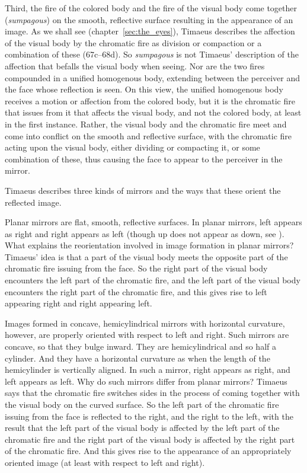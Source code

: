 Third, the fire of the colored body and the fire of the visual body come together (\emph{sumpagous}) on the smooth, reflective surface resulting in the appearance of an image. As we shall see (chapter~\ref{sec:the_eyes}), Timaeus describes the affection of the visual body by the chromatic fire as division  or compaction or a combination of these (67c–68d). So \emph{sumpagous} is not Timaeus' description of the affection that befalls the visual body when seeing. Nor are the two fires compounded in a unified homogenous body, extending between the perceiver and the face whose reflection is seen. On this view, the unified homogenous body receives a motion or affection from the colored body, but it is the chromatic fire that issues from it that affects the visual body, and not the colored body, at least in the first instance.  Rather, the visual body and the chromatic fire meet and come into conflict on the smooth and reflective surface, with the chromatic fire acting upon the visual body, either dividing or compacting it, or some combination of these, thus causing the face to appear to the perceiver in the mirror.

Timaeus describes three kinds of mirrors and the ways that these orient the reflected image.

Planar mirrors are flat, smooth, reflective surfaces. In planar mirrors, left appears as right and right appears as left (though up does not appear as down, see \citealt{Block:1974tk}). What explains the reorientation involved in image formation in planar mirrors? Timae\-us' idea is that a part of the visual body meets the opposite part of the chromatic fire issuing from the face. So the right part of the visual body encounters the left part of the chromatic fire, and the left part of the visual body encounters the right part of the chromatic fire, and this gives rise to left appearing right and right appearing left.

Images formed in concave, hemicylindrical mirrors with horizontal curvature, however, are properly oriented with respect to left and right. Such mirrors are concave, so that they bulge inward. They are hemicylindrical and so half a cylinder. And they have a horizontal curvature as when the length of the hemicylinder is vertically aligned. In such a mirror, right appears as right, and left appears as left. Why do such mirrors differ from planar mirrors? Timaeus says that the chromatic fire switches sides in the process of coming together with the visual body on the curved surface. So the left part of the chromatic fire issuing from the face is reflected to the right, and the right to the left, with the result that the left part of the visual body is affected by the left part of the chromatic fire and the right part of the visual body is affected by the right part of the chromatic fire. And this gives rise to the appearance of an appropriately oriented image (at least with respect to left and right).

